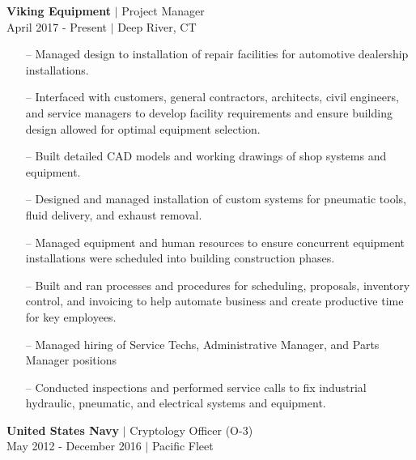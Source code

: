 
{\sc\textbf{Viking Equipment} $\vert$  Project Manager}\\
{\color{gray} April 2017 - Present $\vert$ Deep River, CT} \\
\small{
  \begin{itemize}[leftmargin=*]
  \item[--] Managed design to installation of repair facilities for automotive dealership installations. %
\item[--] Interfaced with customers, general contractors, architects, civil engineers, and service managers to develop facility requirements and ensure building design allowed for optimal equipment selection.
\item[--] Built detailed CAD models and working drawings of shop systems and equipment.
\item[--] Designed and managed installation of custom systems for pneumatic tools, fluid delivery, and exhaust removal.
\item[--] Managed equipment and human resources to ensure concurrent equipment installations were scheduled into building construction phases.
\item[--] Built and ran processes and procedures for scheduling, proposals, inventory control, and invoicing to help automate business and create productive time for key employees.
\item[--] Managed hiring of Service Techs, Administrative Manager, and Parts Manager positions
\item[--] Conducted inspections and performed service calls to fix industrial hydraulic, pneumatic, and electrical systems and equipment.
\end{itemize}
}

\vspace{16pt}

{\sc \textbf{United States Navy} $\vert$ Cryptology Officer (O-3)}\\
{\color{gray} May 2012 - December 2016 $\vert$ Pacific Fleet }\\

